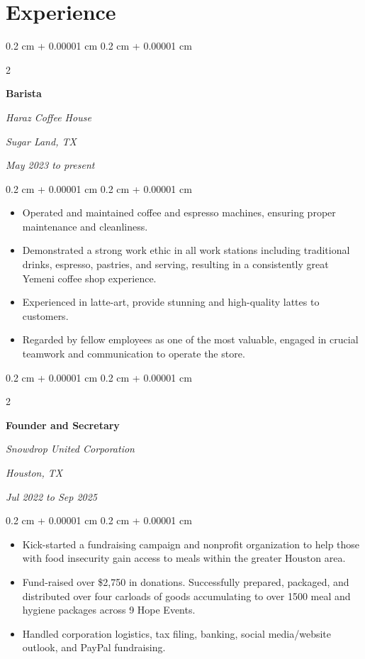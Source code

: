\documentclass[10pt, letterpaper]{article}
\newenvironment{highlights}{
    \begin{itemize}[
        topsep=0.10 cm,
        parsep=0.10 cm,
        partopsep=0pt,
        itemsep=0pt,
        leftmargin=0.4 cm + 10pt
    ]
}{
    \end{itemize}
} %
\newenvironment{onecolentry}{
    \begin{adjustwidth}{
        0.2 cm + 0.00001 cm
    }{
        0.2 cm + 0.00001 cm
    }
}{
    \end{adjustwidth}
} %
\newenvironment{twocolentry}[2][]{
    \onecolentry
    \def\secondColumn{#2}
    \setcolumnwidth{\fill, 4.5 cm}
    \begin{paracol}{2}
}{
    \switchcolumn \raggedleft \secondColumn
    \end{paracol}
    \endonecolentry
} %
\begin{document}
    
    \section{Experience}



        
        \begin{twocolentry}{
        \textit{Sugar Land, TX}    
            
        \textit{May 2023 to present}}
            \textbf{Barista}
            
            \textit{Haraz Coffee House}
        \end{twocolentry}

        \vspace{0.10 cm}
        \begin{onecolentry}
            \begin{highlights}
                \item Operated and maintained coffee and espresso machines, ensuring proper maintenance and cleanliness.
                \item Demonstrated a strong work ethic in all work stations including traditional drinks, espresso, pastries, and serving, resulting in a consistently great Yemeni coffee shop experience.
                \item Experienced in latte-art, provide stunning and high-quality lattes to customers.
                \item Regarded by fellow employees as one of the most valuable, engaged in crucial teamwork and communication to operate the store.
            \end{highlights}
        \end{onecolentry}


        \vspace{0.2 cm}

        \begin{twocolentry}{
        \textit{Houston, TX}    
            
        \textit{Jul 2022 to Sep 2025}}
            \textbf{Founder and Secretary}
            
            \textit{Snowdrop United Corporation}
        \end{twocolentry}

        \vspace{0.10 cm}
        \begin{onecolentry}
            \begin{highlights}
                \item Kick-started a fundraising campaign and nonprofit organization to help those with food insecurity gain access to meals within the greater Houston area.
                \item Fund-raised over \$2,750 in donations. Successfully prepared, packaged, and distributed over four carloads of goods accumulating to over 1500 meal and hygiene packages across 9 Hope Events.
                \item Handled corporation logistics, tax filing, banking, social media/website outlook, and PayPal fundraising.
            \end{highlights}
        \end{onecolentry}
\end{document}
